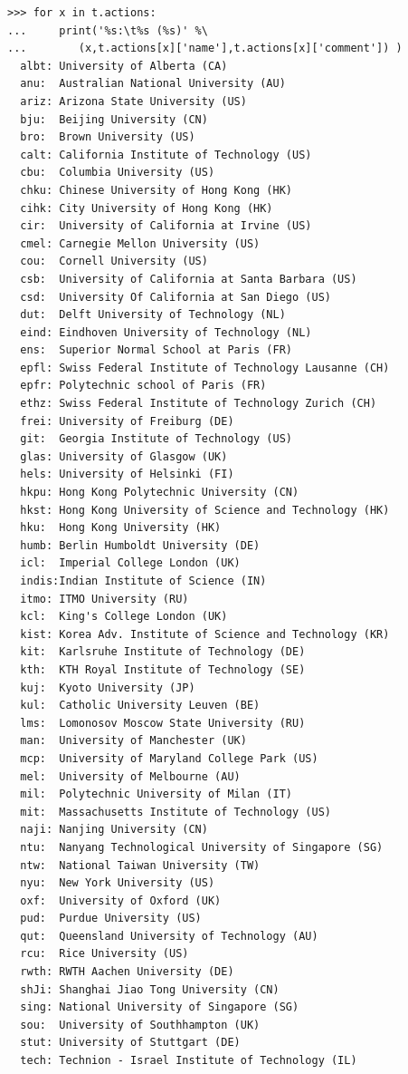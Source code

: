 \begin{lstlisting}[caption={Printing the potential decision actions},label=list:13.2]
>>> for x in t.actions:
...     print('%s:\t%s (%s)' %\
...        (x,t.actions[x]['name'],t.actions[x]['comment']) )
  albt:	University of Alberta (CA)
  anu:	Australian National University (AU)
  ariz:	Arizona State University (US)
  bju:	Beijing University (CN)
  bro:	Brown University (US)
  calt:	California Institute of Technology (US)
  cbu:	Columbia University (US)
  chku:	Chinese University of Hong Kong (HK)
  cihk:	City University of Hong Kong (HK)
  cir:	University of California at Irvine (US)
  cmel:	Carnegie Mellon University (US)
  cou:	Cornell University (US)
  csb:	University of California at Santa Barbara (US)
  csd:	University Of California at San Diego (US)
  dut:	Delft University of Technology (NL)
  eind:	Eindhoven University of Technology (NL)
  ens:	Superior Normal School at Paris (FR)
  epfl:	Swiss Federal Institute of Technology Lausanne (CH)
  epfr:	Polytechnic school of Paris (FR)
  ethz:	Swiss Federal Institute of Technology Zurich (CH)
  frei:	University of Freiburg (DE)
  git:	Georgia Institute of Technology (US)
  glas:	University of Glasgow (UK)
  hels:	University of Helsinki (FI)
  hkpu:	Hong Kong Polytechnic University (CN)
  hkst:	Hong Kong University of Science and Technology (HK)
  hku:	Hong Kong University (HK)
  humb:	Berlin Humboldt University (DE)
  icl:	Imperial College London (UK)
  indis:Indian Institute of Science (IN)
  itmo:	ITMO University (RU)
  kcl:	King's College London (UK)
  kist:	Korea Adv. Institute of Science and Technology (KR)
  kit:	Karlsruhe Institute of Technology (DE)
  kth:	KTH Royal Institute of Technology (SE)
  kuj:	Kyoto University (JP)
  kul:	Catholic University Leuven (BE)
  lms:	Lomonosov Moscow State University (RU)
  man:	University of Manchester (UK)
  mcp:	University of Maryland College Park (US)
  mel:	University of Melbourne (AU)
  mil:	Polytechnic University of Milan (IT)
  mit:	Massachusetts Institute of Technology (US)
  naji:	Nanjing University (CN)
  ntu:	Nanyang Technological University of Singapore (SG)
  ntw:	National Taiwan University (TW)
  nyu:	New York University (US)
  oxf:	University of Oxford (UK)
  pud:	Purdue University (US)
  qut:	Queensland University of Technology (AU)
  rcu:	Rice University (US)
  rwth:	RWTH Aachen University (DE)
  shJi:	Shanghai Jiao Tong University (CN)
  sing:	National University of Singapore (SG)
  sou:	University of Southhampton (UK)
  stut:	University of Stuttgart (DE)
  tech:	Technion - Israel Institute of Technology (IL)

\end{lstlisting}
